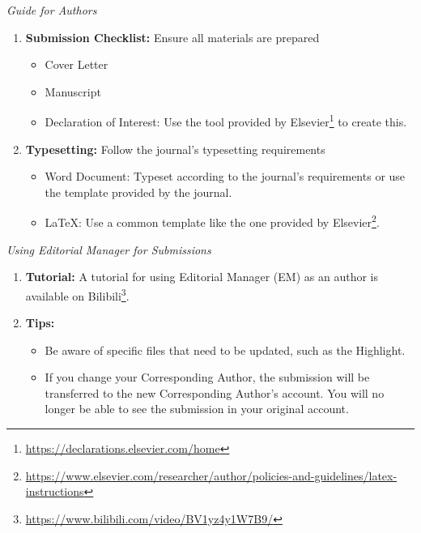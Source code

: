 \documentclass{beamer}
\begin{document}
\begin{frame}{\textit{Guide for Authors}}
    \begin{enumerate}
        \item \textbf{Submission Checklist:} Ensure all materials are prepared
              \begin{itemize}
                  \item Cover Letter
                  \item Manuscript
                  \item Declaration of Interest: Use the tool provided by Elsevier\footnote{\url{https://declarations.elsevier.com/home}} to create this.
              \end{itemize}
        \item \textbf{Typesetting:} Follow the journal's typesetting requirements
              \begin{itemize}
                  \item Word Document: Typeset according to the journal's requirements or use the template provided by the journal.
                  \item \LaTeX: Use a common template like the one provided by Elsevier\footnote{\url{https://www.elsevier.com/researcher/author/policies-and-guidelines/latex-instructions}}.
              \end{itemize}
    \end{enumerate}
\end{frame}

\begin{frame}{\textit{Using Editorial Manager for Submissions}}
    \begin{enumerate}
        \item \textbf{Tutorial:} A tutorial for using Editorial Manager (EM) as an author is available on Bilibili\footnote{\url{https://www.bilibili.com/video/BV1yz4y1W7B9/}}.
        \item \textbf{Tips:}
              \begin{itemize}
                  \item Be aware of specific files that need to be updated, such as the Highlight.
                  \item If you change your Corresponding Author, the submission will be transferred to the new Corresponding Author's account. You will no longer be able to see the submission in your original account.
              \end{itemize}
    \end{enumerate}
\end{frame}
\end{document}

